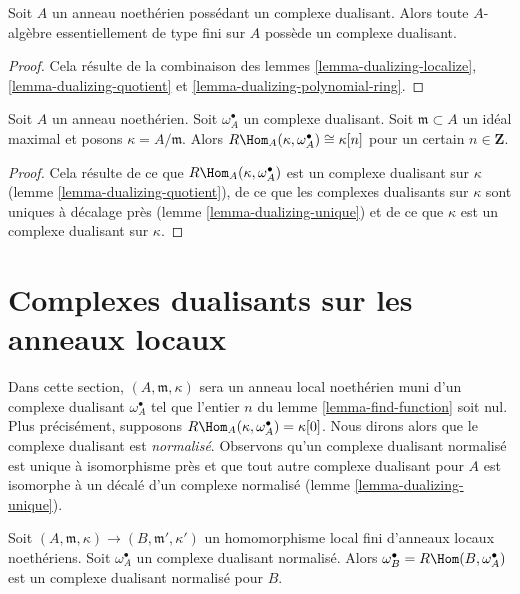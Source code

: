 \begin{proposition}
\label{proposition-dualizing-essentially-finite-type}
Soit $A$ un anneau noethérien possédant un complexe dualisant.
Alors toute $A$-algèbre essentiellement de type fini sur $A$
possède un complexe dualisant.
\end{proposition}

\begin{proof}
Cela résulte de la combinaison des lemmes \ref{lemma-dualizing-localize},
\ref{lemma-dualizing-quotient} et \ref{lemma-dualizing-polynomial-ring}.
\end{proof}

\begin{lemma}
\label{lemma-find-function}
Soit $A$ un anneau noethérien. Soit $\omega_A^\bullet$ un complexe dualisant.
Soit $\mathfrak m \subset A$ un idéal maximal et posons $\kappa = A/\mathfrak m$. Alors
$R\Hom_A(\kappa, \omega_A^\bullet) \cong \kappa[n]$ pour un certain $n \in \mathbf{Z}$.
\end{lemma}

\begin{proof}
Cela résulte de ce que $R\Hom_A(\kappa, \omega_A^\bullet)$ est un complexe dualisant sur $\kappa$
(lemme \ref{lemma-dualizing-quotient}), de ce que les complexes dualisants sur $\kappa$
sont uniques à décalage près (lemme \ref{lemma-dualizing-unique})
et de ce que $\kappa$ est un complexe dualisant sur $\kappa$.
\end{proof}




\section{Complexes dualisants sur les anneaux locaux}
\label{section-dualizing-local}

\noindent
Dans cette section, $(A, \mathfrak m, \kappa)$ sera un anneau local noethérien
muni d'un complexe dualisant $\omega_A^\bullet$ tel que l'entier $n$
du lemme \ref{lemma-find-function} soit nul. Plus précisément, supposons $R\Hom_A(\kappa, \omega_A^\bullet) = \kappa[0]$.
Nous dirons alors que le complexe dualisant est {\it normalisé}.
Observons qu'un complexe dualisant normalisé est unique à isomorphisme près
et que tout autre complexe dualisant pour $A$ est isomorphe
à un décalé d'un complexe normalisé (lemme \ref{lemma-dualizing-unique}).

\begin{lemma}
\label{lemma-normalized-finite}
Soit $(A, \mathfrak m, \kappa) \to (B, \mathfrak m', \kappa')$ un homomorphisme local fini d'anneaux locaux noethériens.
Soit $\omega_A^\bullet$ un complexe dualisant normalisé.
Alors $\omega_B^\bullet = R\Hom(B, \omega_A^\bullet)$ est un complexe dualisant normalisé pour $B$.
\end{lemma}

